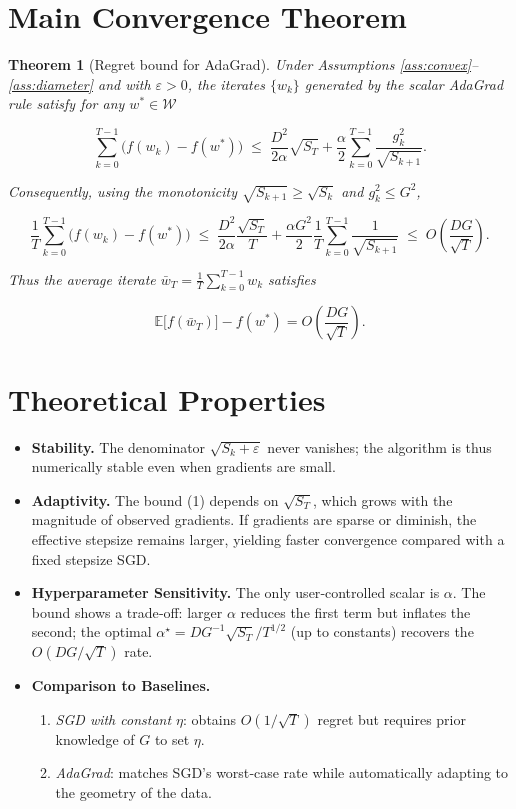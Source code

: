 \documentclass{article}
\newtheorem{theorem}{Theorem}
\begin{document}
\section*{Main Convergence Theorem}
\begin{theorem}[Regret bound for AdaGrad]\label{thm:regret}
Under Assumptions \ref{ass:convex}–\ref{ass:diameter} and with $\varepsilon>0$, the iterates $\{w_{k}\}$ generated by the scalar AdaGrad rule satisfy for any $w^{*}\in\mathcal{W}$

\[
\sum_{k=0}^{T-1}\bigl(f(w_{k})-f(w^{*})\bigr)
   \;\le\;
   \frac{D^{2}}{2\alpha}\sqrt{S_{T}}+\frac{\alpha}{2}\sum_{k=0}^{T-1}\frac{g_{k}^{2}}{\sqrt{S_{k+1}}}.
\tag{1}
\]

Consequently, using the monotonicity $\sqrt{S_{k+1}}\ge\sqrt{S_{k}}$ and $g_{k}^{2}\le G^{2}$,

\[
\frac{1}{T}\sum_{k=0}^{T-1}\bigl(f(w_{k})-f(w^{*})\bigr)
   \;\le\;
   \frac{D^{2}}{2\alpha}\frac{\sqrt{S_{T}}}{T}
   +\frac{\alpha G^{2}}{2}\frac{1}{T}\sum_{k=0}^{T-1}\frac{1}{\sqrt{S_{k+1}}}
   \;\le\;
   O\!\left(\frac{DG}{\sqrt{T}}\right).
\tag{2}
\]

Thus the average iterate $\bar w_{T}= \frac{1}{T}\sum_{k=0}^{T-1}w_{k}$ satisfies  

\[
\mathbb{E}\!\bigl[f(\bar w_{T})\bigr]-f(w^{*}) = O\!\left(\frac{DG}{\sqrt{T}}\right).
\]
\end{theorem}

\section*{Theoretical Properties}
\begin{itemize}
\item \textbf{Stability.} The denominator $\sqrt{S_{k}+\varepsilon}$ never vanishes; the algorithm is thus numerically stable even when gradients are small.
\item \textbf{Adaptivity.} The bound (1) depends on $\sqrt{S_{T}}$, which grows with the magnitude of observed gradients. If gradients are sparse or diminish, the effective stepsize remains larger, yielding faster convergence compared with a fixed stepsize SGD.
\item \textbf{Hyperparameter Sensitivity.} The only user‑controlled scalar is $\alpha$. The bound shows a trade‑off: larger $\alpha$ reduces the first term but inflates the second; the optimal $\alpha^{\star}= D G^{-1}\sqrt{S_{T}}/T^{1/2}$ (up to constants) recovers the $O(DG/\sqrt{T})$ rate.
\item \textbf{Comparison to Baselines.}
    \begin{enumerate}
        \item \emph{SGD with constant $\eta$}: obtains $O(1/\sqrt{T})$ regret but requires prior knowledge of $G$ to set $\eta$.
        \item \emph{AdaGrad}: matches SGD’s worst‑case rate while automatically adapting to the geometry of the data.
    \end{enumerate}
\end{itemize}
\end{document}
